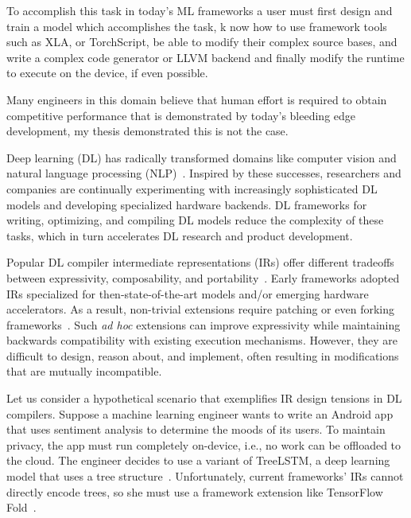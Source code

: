 To accomplish this task in today’s ML frameworks a user must first design and train a model which accomplishes the task, k
now how to use framework tools such as XLA, or TorchScript, be able to modify their complex source bases, and write a complex code generator
or LLVM backend and finally modify the runtime to execute on the device, if even possible.

Many engineers in this domain believe that human effort is required to obtain competitive performance that is demonstrated by today’s bleeding edge development,
my thesis demonstrated this is not the case.

Deep learning (DL) has radically transformed domains like
  computer vision and
  natural language processing (NLP)~\citep{yolo, recent_trends_in_nlp}.
Inspired by these successes,
  researchers and companies are continually
  experimenting with increasingly sophisticated DL models and
  developing specialized hardware backends.
DL frameworks for writing, optimizing, and compiling DL models
  reduce the complexity of these tasks,
  which in turn accelerates DL research and product development.

Popular DL compiler intermediate representations (IRs) offer different tradeoffs
  between expressivity, composability, and portability~\citep{
    tensorflow, pytorch_ad, chainer_learningsys2015, tangent, theano, glow}.
Early frameworks adopted IRs
  specialized for then-state-of-the-art models and/or
  emerging hardware accelerators.
As a result, non-trivial extensions require
  patching or even forking frameworks~\citep{
    tf_fold, tf_lite, tangent, tf_eager, xla, glow, torchscript}.
Such \textit{ad hoc} extensions can improve expressivity
  while maintaining backwards compatibility with existing execution mechanisms.
However, they are difficult to design, reason about, and implement,
  often resulting in modifications that are mutually incompatible.

Let us consider a hypothetical scenario that exemplifies
  IR design tensions in DL compilers.
Suppose a machine learning engineer wants to write
  an Android app that uses sentiment analysis to
  determine the moods of its users.
To maintain privacy, the app must run completely on-device,
  i.e., no work can be offloaded to the cloud.
The engineer decides to use a variant of TreeLSTM,
  a deep learning model that uses a tree structure~\citep{tree_lstm}.
Unfortunately, current frameworks' IRs cannot directly encode trees,
  so she must use a framework extension
  like TensorFlow Fold~\citep{tensorflowfold}.

